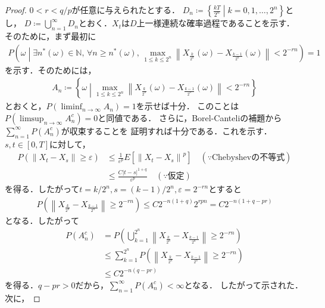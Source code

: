 \documentclass[dvipdfmx,autodetect-engine]{jsarticle}
\theoremstyle{remark}
\theoremstyle{definition}
\newcommand{\N}{\mathbb{N}}
\newcommand{\abs}[1]{\left\lvert#1\right\rvert}
\newcommand{\norm}[1]{\left\lVert#1\right\rVert}
\newcommand{\setmid}{\mathrel{} \middle| \mathrel{}}
\begin{document}
\begin{proof}
    $0<r<q/p$が任意に与えられたとする．
    $D_{n} \coloneqq \left\{\frac{kT}{2^n} \setmid k=0,1,\ldots,2^{n}\right\}$とし，
    $D \coloneqq \bigcup_{n=1}^{\infty} D_n$とおく．$X_{t}$は$D$上一様連続な確率過程であることを示す．
    そのために，まず最初に
    \begin{align}\label{step1}
        P\left(\omega \setmid 
        \exists n^{*}(\omega)\in \N,\,\forall n \geq n^{*}(\omega),\,
        \max_{1\leq k\leq 2^{n}} \norm{X_{\frac{k}{2^n}}(\omega) - X_{\frac{k-1}{2^n}}(\omega)}
        < 2^{-rn}\right) = 1
    \end{align}
    を示す．そのためには，
    \begin{align}
        A_{n} \coloneqq \left\{ \omega \setmid 
        \max_{1\leq k\leq 2^n} \norm{X_{\frac{k}{2^n}}(\omega) - 
        X_{\frac{k-1}{2^n}}(\omega)} < 2^{-rn}\right\}
    \end{align}
    とおくと，$P(\liminf_{n\to\infty} A_{n})=1$を示せば十分．
    このことは$P(\limsup_{n\to\infty}A_{n}^{c})=0$と同値である．
    さらに，Borel-Canteliの補題から$\sum_{n=1}^{\infty}P(A_{n}^{c})$が収束することを
    証明すれば十分である．これを示す．
    $s,t \in [0,T]$に対して，
    \begin{align}
        P(\norm{X_{t} - X_{s}} \geq \varepsilon) 
        &\leq \frac{1}{\varepsilon^{p}} E[\norm{X_{t} - X_{s}}^{p}] 
        \quad (\because \text{Chebyshevの不等式})\\
        &\leq  \frac{C\abs{t-s}^{1+q}}{\varepsilon^{p}} \quad (\because \text{仮定})
    \end{align}
    を得る．したがって$t=k/2^{n},s=(k-1)/2^{n},\varepsilon = 2^{-rn}$とすると
    \begin{align}
        P\left(\norm{ X_{\frac{k}{2^{n}}} - X_{\frac{k-1}{2^{n}}} } \geq 2^{-rn}\right)
        \leq C 2^{-n(1+q)}2^{rpn} = C 2^{-n(1+q-pr)}
    \end{align}
    となる．したがって
    \begin{align}
        P(A_{n}^{c}) &= P\left( \bigcup_{k=1}^{2^{n}} 
        \norm{ X_{\frac{k}{2^{n}}} - X_{\frac{k-1}{2^{n}}} } \geq 2^{-rn} \right)\\
        &\leq \sum_{k=1}^{2^{n}} P\left(
            \norm{ X_{\frac{k}{2^{n}}} - X_{\frac{k-1}{2^{n}}} } \geq 2^{-rn}
         \right)\\
         &\leq C2^{-n(q-pr)}
    \end{align}
    を得る．$q-pr>0$だから，$\sum_{n=1}^{\infty} P(A_{n}^{c}) < \infty$となる．
    したがって示された．次に，

\end{proof}
\end{document}
